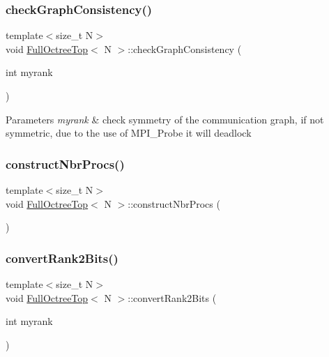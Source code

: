 \subsubsection{\texorpdfstring{check\+Graph\+Consistency()}{checkGraphConsistency()}}
{\footnotesize\ttfamily template$<$size\+\_\+t N$>$ \\
void \mbox{\hyperlink{classFullOctreeTop}{Full\+Octree\+Top}}$<$ N $>$\+::check\+Graph\+Consistency (\begin{DoxyParamCaption}\item[{int}]{myrank }\end{DoxyParamCaption})}


\begin{DoxyParams}{Parameters}
{\em myrank} & check symmetry of the communication graph, if not symmetric, due to the use of M\+P\+I\+\_\+\+Probe it will deadlock \\
\hline
\end{DoxyParams}
\mbox{\label{classFullOctreeTop_a8d1c99d8540c1d4a229585c1ced29df4}} 
\subsubsection{\texorpdfstring{construct\+Nbr\+Procs()}{constructNbrProcs()}}
{\footnotesize\ttfamily template$<$size\+\_\+t N$>$ \\
void \mbox{\hyperlink{classFullOctreeTop}{Full\+Octree\+Top}}$<$ N $>$\+::construct\+Nbr\+Procs (\begin{DoxyParamCaption}{ }\end{DoxyParamCaption})}

\mbox{\label{classFullOctreeTop_a208b0b5fbaf4ee8b63851c976a2668f7}} 
\subsubsection{\texorpdfstring{convert\+Rank2\+Bits()}{convertRank2Bits()}}
{\footnotesize\ttfamily template$<$size\+\_\+t N$>$ \\
void \mbox{\hyperlink{classFullOctreeTop}{Full\+Octree\+Top}}$<$ N $>$\+::convert\+Rank2\+Bits (\begin{DoxyParamCaption}\item[{int}]{myrank }\end{DoxyParamCaption})}

